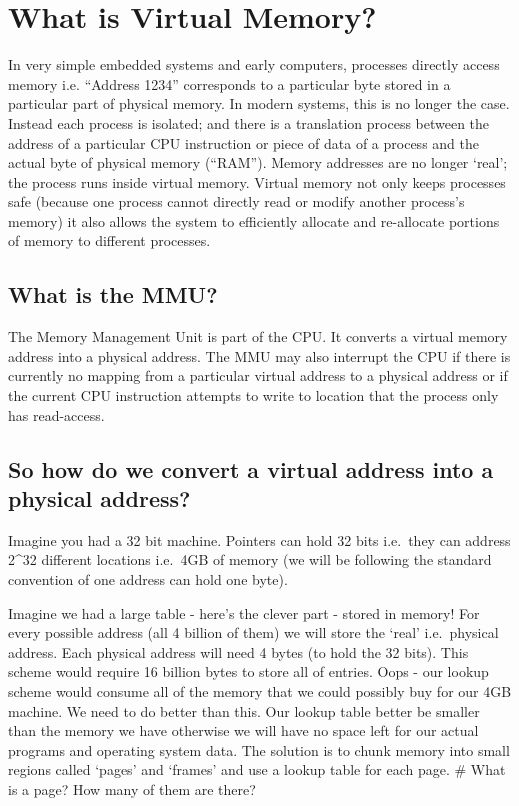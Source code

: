 \section{What is Virtual Memory?}\label{what-is-virtual-memory}

In very simple embedded systems and early computers, processes directly
access memory i.e. ``Address 1234'' corresponds to a particular byte
stored in a particular part of physical memory. In modern systems, this
is no longer the case. Instead each process is isolated; and there is a
translation process between the address of a particular CPU instruction
or piece of data of a process and the actual byte of physical memory
(``RAM''). Memory addresses are no longer `real'; the process runs
inside virtual memory. Virtual memory not only keeps processes safe
(because one process cannot directly read or modify another process's
memory) it also allows the system to efficiently allocate and
re-allocate portions of memory to different processes.

\subsection{What is the MMU?}\label{what-is-the-mmu}

The Memory Management Unit is part of the CPU. It converts a virtual
memory address into a physical address. The MMU may also interrupt the
CPU if there is currently no mapping from a particular virtual address
to a physical address or if the current CPU instruction attempts to
write to location that the process only has read-access.

\subsection{So how do we convert a virtual address into a physical
address?}\label{so-how-do-we-convert-a-virtual-address-into-a-physical-address}

Imagine you had a 32 bit machine. Pointers can hold 32 bits i.e.~they
can address 2\^{}32 different locations i.e.~4GB of memory (we will be
following the standard convention of one address can hold one byte).

Imagine we had a large table - here's the clever part - stored in
memory! For every possible address (all 4 billion of them) we will store
the `real' i.e.~physical address. Each physical address will need 4
bytes (to hold the 32 bits). This scheme would require 16 billion bytes
to store all of entries. Oops - our lookup scheme would consume all of
the memory that we could possibly buy for our 4GB machine. We need to do
better than this. Our lookup table better be smaller than the memory we
have otherwise we will have no space left for our actual programs and
operating system data. The solution is to chunk memory into small
regions called `pages' and `frames' and use a lookup table for each
page. \# What is a page? How many of them are there?

